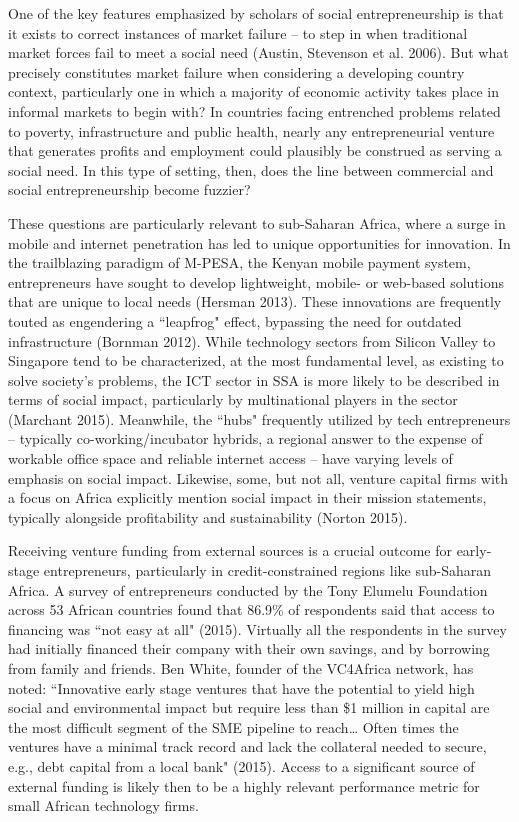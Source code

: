 \documentclass[12pt]{article}
\begin{document}
One of the key features emphasized by scholars of social entrepreneurship is that it exists to correct instances of market failure -- to step in when traditional market forces fail to meet a social need (Austin, Stevenson et al. 2006). But what precisely constitutes market failure when considering a developing country context, particularly one in which a majority of economic activity takes place in informal markets to begin with? In countries facing entrenched problems related to poverty, infrastructure and public health, nearly any entrepreneurial venture that generates profits and employment could plausibly be construed as serving a social need. In this type of setting, then, does the line between commercial and social entrepreneurship become fuzzier?

These questions are particularly relevant to sub-Saharan Africa, where a surge in mobile and internet penetration has led to unique opportunities for innovation. In the trailblazing paradigm of M-PESA, the Kenyan mobile payment system, entrepreneurs have sought to develop lightweight, mobile- or web-based solutions that are unique to local needs (Hersman 2013). These innovations are frequently touted as engendering a ``leapfrog" effect, bypassing the need for outdated infrastructure (Bornman 2012). While technology sectors from Silicon Valley to Singapore tend to be characterized, at the most fundamental level, as existing to solve society's problems, the ICT sector in SSA is more likely to be described in terms of social impact, particularly by multinational players in the sector (Marchant 2015). Meanwhile, the ``hubs" frequently utilized by tech entrepreneurs -- typically co-working/incubator hybrids, a regional answer to the expense of workable office space and reliable internet access -- have varying levels of emphasis on social impact. Likewise, some, but not all, venture capital firms with a focus on Africa explicitly mention social impact in their mission statements, typically alongside profitability and sustainability (Norton 2015).

Receiving venture funding from external sources is a crucial outcome for early-stage entrepreneurs, particularly in credit-constrained regions like sub-Saharan Africa. A survey of entrepreneurs conducted by the Tony Elumelu Foundation across 53 African countries found that 86.9\% of respondents said that access to financing was ``not easy at all" (2015). Virtually all the respondents in the survey had initially financed their company with their own savings, and by borrowing from family and friends. Ben White, founder of the VC4Africa network, has noted: ``Innovative early stage ventures that have the potential to yield high social and environmental impact but require less than \$1 million in capital are the most difficult segment of the SME pipeline to reach… Often times the ventures have a minimal track record and lack the collateral needed to secure, e.g., debt capital from a local bank" (2015). Access to a significant source of external funding is likely then to be a highly relevant performance metric for small African technology firms. 
\end{document}
